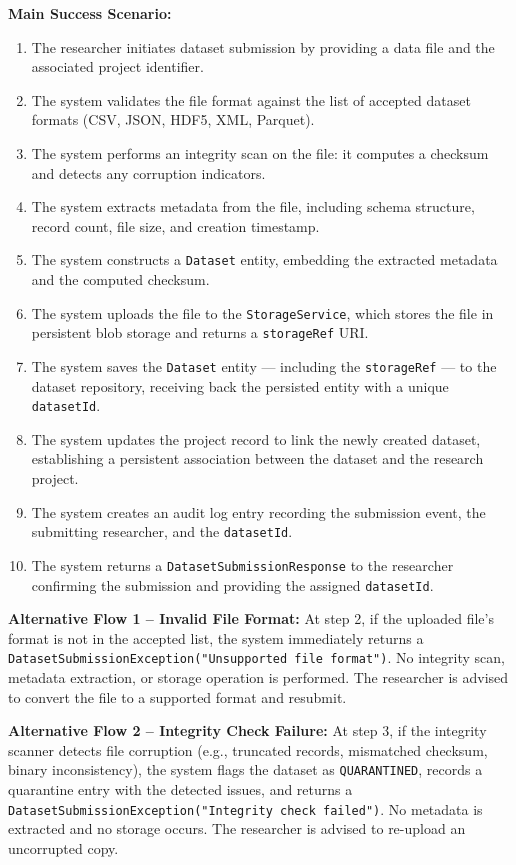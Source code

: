 \documentclass[12pt,a4paper]{article}
\newcommand{\code}[1]{\texttt{\small #1}}
\begin{document}
\textbf{Main Success Scenario:}

\begin{enumerate}
  \item The researcher initiates dataset submission by providing a data file and the associated project identifier.
  \item The system validates the file format against the list of accepted dataset formats (CSV, JSON, HDF5, XML, Parquet).
  \item The system performs an integrity scan on the file: it computes a checksum and detects any corruption indicators.
  \item The system extracts metadata from the file, including schema structure, record count, file size, and creation timestamp.
  \item The system constructs a \code{Dataset} entity, embedding the extracted metadata and the computed checksum.
  \item The system uploads the file to the \code{StorageService}, which stores the file in persistent blob storage and returns a \code{storageRef} URI.
  \item The system saves the \code{Dataset} entity --- including the \code{storageRef} --- to the dataset repository, receiving back the persisted entity with a unique \code{datasetId}.
  \item The system updates the project record to link the newly created dataset, establishing a persistent association between the dataset and the research project.
  \item The system creates an audit log entry recording the submission event, the submitting researcher, and the \code{datasetId}.
  \item The system returns a \code{DatasetSubmissionResponse} to the researcher confirming the submission and providing the assigned \code{datasetId}.
\end{enumerate}

\noindent\textbf{Alternative Flow 1 -- Invalid File Format:}
At step 2, if the uploaded file's format is not in the accepted list, the system immediately returns a \code{DatasetSubmissionException("Unsupported file format")}. No integrity scan, metadata extraction, or storage operation is performed. The researcher is advised to convert the file to a supported format and resubmit.

\noindent\textbf{Alternative Flow 2 -- Integrity Check Failure:}
At step 3, if the integrity scanner detects file corruption (e.g., truncated records, mismatched checksum, binary inconsistency), the system flags the dataset as \code{QUARANTINED}, records a quarantine entry with the detected issues, and returns a \code{DatasetSubmissionException("Integrity check failed")}. No metadata is extracted and no storage occurs. The researcher is advised to re-upload an uncorrupted copy.
\end{document}
